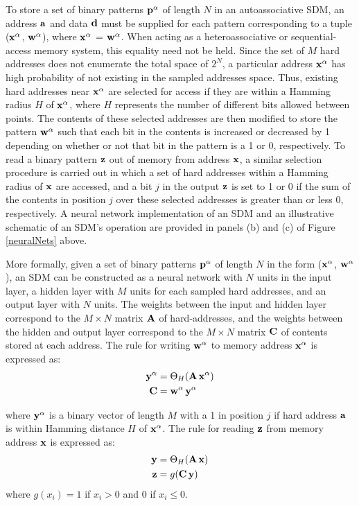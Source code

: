 \documentclass[10pt,letterpaper]{article}
\begin{document}
To store a set of binary patterns $\bf{p}^{\alpha}$ of length $N$ in an autoassociative SDM, an address $\bf{a}$ and data $\bf{d}$ must be supplied for each pattern corresponding to a tuple ($\bf{x}^{\alpha}$, $\bf{w}^{\alpha}$), where $\bf{x}^{\alpha}$ = $\bf{w}^{\alpha}$. When acting as a heteroassociative or sequential-access memory system, this equality need not be held. Since the set of $M$ hard addresses does not enumerate the total space of $2^{N}$, a particular address $\bf{x}^{\alpha}$ has high probability of not existing in the sampled addresses space. Thus, existing hard addresses near $\bf{x}^{\alpha}$ are selected for access if they are within a Hamming radius $H$ of $\bf{x}^{\alpha}$, where $H$ represents the number of different bits allowed between points. The contents of these selected addresses are then modified to store the pattern $\bf{w}^{\alpha}$ such that each bit in the contents is increased or decreased by 1 depending on whether or not that bit in the pattern is a 1 or 0, respectively. To read a binary pattern $\bf{z}$ out of memory from address $\bf{x}$, a similar selection procedure is carried out in which a set of hard addresses within a Hamming radius of $\bf{x}$ are accessed, and a bit $j$ in the output $\bf{z}$ is set to 1 or 0 if the sum of the contents in position $j$ over these selected addresses is greater than or less 0, respectively. A neural network implementation of an SDM and an illustrative schematic of an SDM's operation are provided in panels (b) and (c) of Figure \ref{neuralNets} above.

More formally, given a set of binary patterns $\bf{p}^{\alpha}$ of length $N$ in the form ($\bf{x}^{\alpha}$, $\bf{w}^{\alpha}$), an SDM can be constructed as a neural network with $N$ units in the input layer, a hidden layer with $M$ units for each sampled hard addresses, and an output layer with $N$ units. The weights between the input and hidden layer correspond to the $M \times N$ matrix $\bf{A}$ of hard-addresses, and the weights between the hidden and output layer correspond to the $M \times N$ matrix $\bf{C}$ of contents stored at each address. The rule for writing $\bf{w}^{\alpha}$ to memory address $\bf{x}^{\alpha}$ is expressed as:
\begin{align}
 \bf{y}^{\alpha} &= \Theta_{H}(\bf{A}\,\bf{x}^{\alpha}) \\	
 \bf{C} &= \bf{w}^{\alpha}\,\bf{y}^{\alpha} 
\end{align}

\noindent where $\bf{y}^{\alpha}$ is a binary vector of length $M$ with a 1 in position $j$ if hard address $\bf{a}$ is within Hamming distance $H$ of $\bf{x}^{\alpha}$. The rule for reading $\bf{z}$ from memory address $\bf{x}$ is expressed as:
\begin{align}
 \bf{y} &= \Theta_{H}(\bf{A}\,\bf{x}) \\	
 \bf{z} &= g(\bf{C}\,\bf{y}) 
\end{align}
\noindent where $g(x_{i}) = 1$ if $x_{i} > 0$ and $0$ if $x_{i} \leq 0$.  
\end{document}
